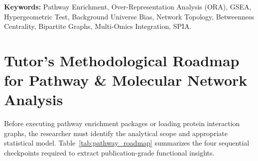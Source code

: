 \documentclass[11pt,oneside]{book}
\begin{document}
\noindent\textbf{Keywords:} Pathway Enrichment, Over-Representation Analysis (ORA), GSEA, Hypergeometric Test, Background Universe Bias, Network Topology, Betweenness Centrality, Bipartite Graphs, Multi-Omics Integration, SPIA.

\vspace{1.5em}

\section{Tutor's Methodological Roadmap for Pathway \& Molecular Network Analysis}

Before executing pathway enrichment packages or loading protein interaction graphs, the researcher must identify the analytical scope and appropriate statistical model. Table~\ref{tab:pathway_roadmap} summarizes the four sequential checkpoints required to extract publication-grade functional insights.
\end{document}
